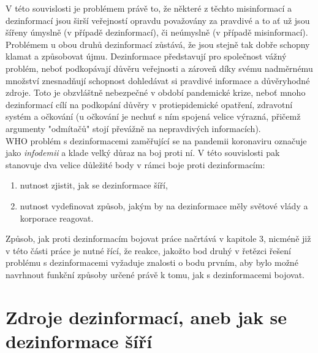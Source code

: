 V této souvislosti je problémem právě to, že některé z těchto misinformací a dezinformací jsou širší veřejností opravdu považovány za pravdivé a to ať už jsou šířeny úmyslně (v případě dezinformací), či neúmyslně (v případě misinformací). Problémem u obou druhů dezinformací zůstává, že jsou stejně tak dobře schopny klamat a způsobovat újmu. Dezinformace představují pro společnost vážný problém, neboť podkopávají důvěru veřejnosti a zároveň díky svému nadměrnému množství znesnadňují schopnost dohledávat si pravdivé informace a důvěryhodné zdroje. Toto je obzvláštně nebezpečné v období pandemické krize, neboť mnoho dezinformací cílí na podkopání důvěry v protiepidemické opatření, zdravotní systém a očkování (u očkování je nechuť s ním spojená velice výrazná, přičemž argumenty "odmítačů" stojí převážně na nepravdivých informacích).\\ %

WHO problém s dezinformacemi zaměřující se na pandemii koronaviru označuje jako \textit{infodemii} a klade velký důraz na boj proti ní\cite{noauthor_covid-19_nodate}. V této souvislosti pak stanovuje dva velice důležité body v rámci boje proti dezinformacím:

\begin{enumerate}
\item nutnost zjistit, jak se dezinformace šíří,
\item nutnost vydefinovat způsob, jakým by na dezinformace měly světové vlády a korporace reagovat.	
\end{enumerate}


Způsob, jak proti dezinformacím bojovat práce načrtává v kapitole 3, nicméně již v této části práce je nutné řící, že reakce, jakožto bod druhý v řetězci řešení problému s dezinformacemi vyžaduje znalosti o bodu prvním, aby bylo možné navrhnout funkční způsoby určené právě k tomu, jak s dezinformacemi bojovat.\\


\section{Zdroje dezinformací, aneb jak se dezinformace šíří}

